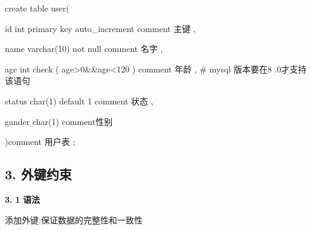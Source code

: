 \documentclass[
  letterpaper,
  DIV=11,
  numbers=noendperiod]{scrreprt}
\newenvironment{Shaded}{\begin{snugshade}}{\end{snugshade}}
\newcommand{\CharTok}[1]{\textcolor[rgb]{0.13,0.47,0.30}{#1}}
\newcommand{\DataTypeTok}[1]{\textcolor[rgb]{0.68,0.00,0.00}{#1}}
\newcommand{\DecValTok}[1]{\textcolor[rgb]{0.68,0.00,0.00}{#1}}
\newcommand{\FunctionTok}[1]{\textcolor[rgb]{0.28,0.35,0.67}{#1}}
\newcommand{\KeywordTok}[1]{\textcolor[rgb]{0.00,0.23,0.31}{#1}}
\newcommand{\NormalTok}[1]{\textcolor[rgb]{0.00,0.23,0.31}{#1}}
\newcommand{\OperatorTok}[1]{\textcolor[rgb]{0.37,0.37,0.37}{#1}}
\newcommand{\StringTok}[1]{\textcolor[rgb]{0.13,0.47,0.30}{#1}}
\begin{document}
\begin{Shaded}
\begin{Highlighting}[]
\KeywordTok{create} \KeywordTok{table} \FunctionTok{user}\NormalTok{(}

\KeywordTok{id} \DataTypeTok{int} \KeywordTok{primary} \KeywordTok{key}\NormalTok{ auto\_increment }\KeywordTok{comment} \StringTok{\textquotesingle{}主键 \textquotesingle{}}\NormalTok{,}

\NormalTok{name }\DataTypeTok{varchar}\NormalTok{(}\DecValTok{10}\NormalTok{) }\KeywordTok{not} \KeywordTok{null} \KeywordTok{comment} \StringTok{\textquotesingle{}名字 \textquotesingle{}}\NormalTok{,}

\NormalTok{age }\DataTypeTok{int} \KeywordTok{check}\NormalTok{ ( age}\OperatorTok{\textgreater{}}\DecValTok{0}\CharTok{\&\&age}\OperatorTok{\textless{}}\DecValTok{120}\NormalTok{ ) }\KeywordTok{comment} \StringTok{\textquotesingle{}年龄 \textquotesingle{}}\NormalTok{,  \# mysql 版本要在8 .0才支持该语句 }

\NormalTok{status }\DataTypeTok{char}\NormalTok{(}\DecValTok{1}\NormalTok{) }\KeywordTok{default} \StringTok{\textquotesingle{}1 \textquotesingle{}}\NormalTok{comment }\StringTok{\textquotesingle{}状态 \textquotesingle{}}\NormalTok{,}

\NormalTok{gander }\DataTypeTok{char}\NormalTok{(}\DecValTok{1}\NormalTok{) comment}\StringTok{\textquotesingle{}性别 \textquotesingle{}}

\NormalTok{)}\KeywordTok{comment} \StringTok{\textquotesingle{}用户表 \textquotesingle{}}\NormalTok{;}
\end{Highlighting}
\end{Shaded}

\hypertarget{ux5916ux952eux7ea6ux675f}{%
\subsection{\texorpdfstring{\textbf{3.}
\textbf{外键约束}}{3. 外键约束}}\label{ux5916ux952eux7ea6ux675f}}

\textbf{3.} \textbf{1} \textbf{语法}

添加外键:保证数据的完整性和一致性
\end{document}
